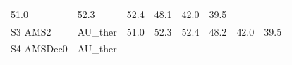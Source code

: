 \documentclass[]{article}
\begin{document}
\begin{longtable}[]{@{}llrrrrrr@{}}
\begin{minipage}[t]{0.09\columnwidth}
51.0\strut
\end{minipage} & \begin{minipage}[t]{0.09\columnwidth}\raggedleft\strut
52.3\strut
\end{minipage} & \begin{minipage}[t]{0.09\columnwidth}\raggedleft\strut
52.4\strut
\end{minipage} & \begin{minipage}[t]{0.09\columnwidth}\raggedleft\strut
48.1\strut
\end{minipage} & \begin{minipage}[t]{0.09\columnwidth}\raggedleft\strut
42.0\strut
\end{minipage} & \begin{minipage}[t]{0.09\columnwidth}\raggedleft\strut
39.5\strut
\end{minipage}\tabularnewline
\begin{minipage}[t]{0.14\columnwidth}\raggedright\strut
S3 AMS2\strut
\end{minipage} & \begin{minipage}[t]{0.13\columnwidth}\raggedright\strut
AU\_ther\strut
\end{minipage} & \begin{minipage}[t]{0.09\columnwidth}\raggedleft\strut
51.0\strut
\end{minipage} & \begin{minipage}[t]{0.09\columnwidth}\raggedleft\strut
52.3\strut
\end{minipage} & \begin{minipage}[t]{0.09\columnwidth}\raggedleft\strut
52.4\strut
\end{minipage} & \begin{minipage}[t]{0.09\columnwidth}\raggedleft\strut
48.2\strut
\end{minipage} & \begin{minipage}[t]{0.09\columnwidth}\raggedleft\strut
42.0\strut
\end{minipage} & \begin{minipage}[t]{0.09\columnwidth}\raggedleft\strut
39.5\strut
\end{minipage}\tabularnewline
\begin{minipage}[t]{0.14\columnwidth}\raggedright\strut
S4 AMSDec0\strut
\end{minipage} & \begin{minipage}[t]{0.13\columnwidth}\raggedright\strut
AU\_ther\strut
\end{minipage} & \begin{minipage}[t]{0.09\columnwidth}\raggedleft\strut

\end{minipage}
\end{longtable}
\end{document}
